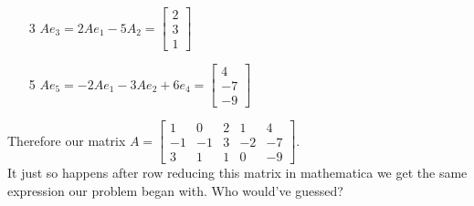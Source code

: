 \documentclass[12pt, letterpaper]{article}
\begin{document}
\begin{enumerate}
\begin{enumerate}
	\item[3] $Ae_3 = 2 Ae_1 - 5 A_2 = \begin{bmatrix} 2 \\ 3 \\ 1 \end{bmatrix}	 $
	\item[5] $A e_5 = -2 Ae_1 - 3 Ae_2 + 6e_4 = \begin{bmatrix} 4 \\ -7 \\ -9 \end{bmatrix}$
\end{enumerate} 
	Therefore our matrix $A = \begin{bmatrix}
	1 & 0 & 2 & 1 & 4\\
	-1 & -1 & 3 & -2 & -7\\
	3 & 1 & 1 & 0 & -9
\end{bmatrix}	 $. \\ It just so happens after row reducing this matrix in mathematica we get the same expression our problem began with.  Who would've guessed?
	\newpage
\end{enumerate}
\end{document}
